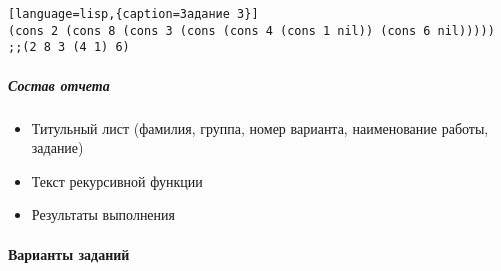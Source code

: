 \documentclass[a4paper,12pt]{article}
\begin{document}
\begin{lstlisting}[language=lisp,{caption=Задание 3}]
(cons 2	(cons 8 (cons 3 (cons (cons 4 (cons 1 nil)) (cons 6 nil)))))
;;(2 8 3 (4 1) 6)
\end{lstlisting}

\subparagraph{Состав отчета}
\begin{itemize}
	\item Титульный лист (фамилия, группа, номер варианта, наименование работы, задание)
	\item Текст рекурсивной функции
	\item Результаты выполнения
\end{itemize}

\paragraph{Варианты заданий}
\end{document}
